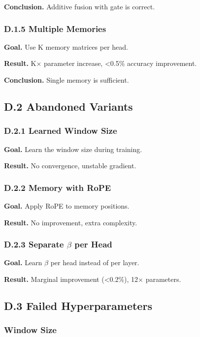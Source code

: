 \textbf{Conclusion.} Additive fusion with gate is correct.

\subsubsection{D.1.5 Multiple Memories}

\textbf{Goal.} Use K memory matrices per head.

\textbf{Result.} K$\times$ parameter increase, \textless{}0.5\% accuracy improvement.

\textbf{Conclusion.} Single memory is sufficient.

\subsection{D.2 Abandoned Variants}

\subsubsection{D.2.1 Learned Window Size}

\textbf{Goal.} Learn the window size during training.

\textbf{Result.} No convergence, unstable gradient.

\subsubsection{D.2.2 Memory with RoPE}

\textbf{Goal.} Apply RoPE to memory positions.

\textbf{Result.} No improvement, extra complexity.

\subsubsection{D.2.3 Separate $\beta$ per Head}

\textbf{Goal.} Learn $\beta$ per head instead of per layer.

\textbf{Result.} Marginal improvement (\textless{}0.2\%), 12$\times$ parameters.

\subsection{D.3 Failed Hyperparameters}

\subsubsection{Window Size}

